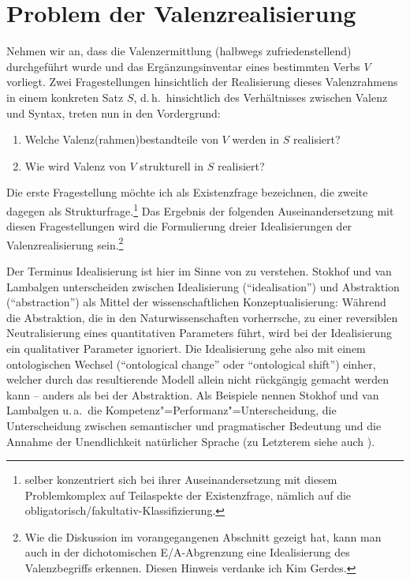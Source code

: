 \section{Problem der Valenzrealisierung} \label{sec-valenzrealisierung}

Nehmen wir an, dass die Valenzermittlung (halbwegs zufriedenstellend) durchgeführt wurde und das Ergänzungsinventar eines bestimmten Verbs $V$ vorliegt. Zwei Fragestellungen hinsichtlich der Realisierung dieses Valenzrahmens in einem konkreten Satz $S$, d.\,h.\ hinsichtlich des Verhältnisses zwischen Valenz und Syntax, treten nun in den Vordergrund: 
\begin{enumerate}
  \item Welche Valenz(rahmen)bestandteile von $V$ werden in $S$ realisiert?
  \item Wie wird Valenz von $V$ strukturell in $S$ realisiert?
\end{enumerate}
Die erste Fragestellung möchte ich als Existenzfrage bezeichnen, die zweite dagegen als Strukturfrage.\footnote{\cite{Storrer:92} selber konzentriert sich bei ihrer Auseinandersetzung mit diesem Problemkomplex auf Teilaspekte der Existenzfrage, nämlich auf die obligatorisch/fakultativ-Klassifizierung.} Das Ergebnis der folgenden Auseinandersetzung mit diesen Fragestellungen wird die Formulierung dreier Idealisierungen der Valenzrealisierung sein.\footnote{Wie die Diskussion im vorangegangenen Abschnitt gezeigt hat, kann man auch in der  dichotomischen E/A-Abgrenzung eine Idealisierung des Valenzbegriffs erkennen. Diesen Hinweis verdanke ich Kim Gerdes.}

Der Terminus Idealisierung ist hier im Sinne von \cite{Stokhof:Lambalgen:11} zu verstehen. Stokhof und van Lambalgen unterscheiden zwischen Idealisierung ("`idealisation"') und Abstraktion ("`abstraction"') als Mittel der wissenschaftlichen Konzeptualisierung: Während die Abstraktion, die in den Naturwissenschaften vorherrsche, zu einer reversiblen Neutralisierung eines quantitativen Parameters führt, wird bei der Idealisierung ein qualitativer Parameter ignoriert. Die Idealisierung gehe also mit einem ontologischen Wechsel ("`ontological change"' oder "`ontological shift"') einher, welcher durch das resultierende Modell allein nicht rückgängig gemacht werden kann -- anders als bei der Abstraktion. Als Beispiele nennen Stokhof und van Lambalgen u.\,a.\ die Kompetenz"=Performanz"=Unterscheidung, die Unterscheidung zwischen semantischer und pragmatischer Bedeutung und die Annahme der Unendlichkeit natürlicher Sprache (zu Letzterem siehe auch \citealt{Pullum:Scholz:10}). 

